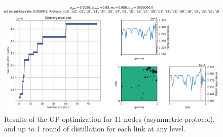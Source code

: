 \documentclass{article}
\begin{document}
\begin{figure}[ht!]
  \centering
  \includegraphics[width=\linewidth, trim = 10 10 10 50, clip]{asymmetric/gp11,1/skopt_gp.png}
  \caption{Results of the GP optimization for 11 nodes (asymmetric protocol), and up to 1 round of distillation for each link at any level.}
  \label{fig:asymmetric_11_nodes}
\end{figure}
\end{document}
